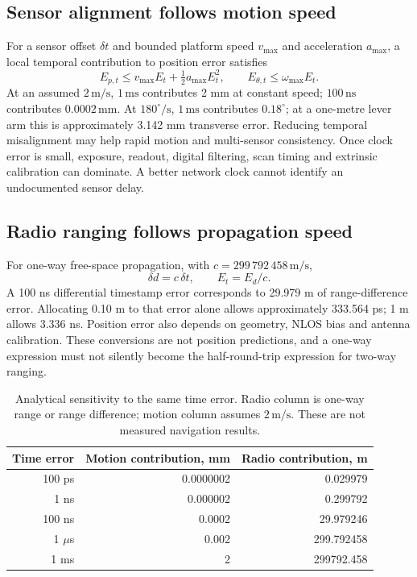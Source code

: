 \documentclass[11pt,letterpaper]{article}
\newcommand{\ns}{\,\mathrm{ns}}\newcommand{\us}{\,\mu\mathrm{s}}\newcommand{\ms}{\,\mathrm{ms}}
\begin{document}
\subsection{Sensor alignment follows motion speed}
For a sensor offset $\delta t$ and bounded platform speed $v_{\max}$ and acceleration $a_{\max}$, a local temporal contribution to position error satisfies
\begin{equation}
 E_{p,t}\leq v_{\max}E_t+\tfrac12 a_{\max}E_t^2,
 \qquad E_{\theta,t}\leq\omega_{\max}E_t.\label{eq:motion}
\end{equation}
At an assumed $2\,\mathrm{m/s}$, $1\ms$ contributes 2 mm at constant speed; $100\ns$ contributes $0.0002\,\mathrm{mm}$. At $180^\circ/\mathrm{s}$, $1\ms$ contributes $0.18^\circ$; at a one-metre lever arm this is approximately 3.142 mm transverse error. Reducing temporal misalignment may help rapid motion and multi-sensor consistency. Once clock error is small, exposure, readout, digital filtering, scan timing and extrinsic calibration can dominate. A better network clock cannot identify an undocumented sensor delay.

\subsection{Radio ranging follows propagation speed}
For one-way free-space propagation, with $c=299\,792\,458\,\mathrm{m/s}$,
\begin{equation}
 \delta d=c\,\delta t,\qquad E_t=E_d/c.\label{eq:light}
\end{equation}
A 100 ns differential timestamp error corresponds to 29.979 m of range-difference error. Allocating 0.10 m to that error alone allows approximately 333.564 ps; 1 m allows 3.336 ns. Position error also depends on geometry, NLOS bias and antenna calibration. These conversions are not position predictions, and a one-way expression must not silently become the half-round-trip expression for two-way ranging.

\begin{table}[ht]\centering\small
\caption{Analytical sensitivity to the same time error. Radio column is one-way range or range difference; motion column assumes $2\,\mathrm{m/s}$. These are not measured navigation results.}
\begin{tabular}{@{}rrr@{}}\toprule
Time error & Motion contribution, mm & Radio contribution, m\\\midrule
100 ps &0.0000002&0.029979\\
1 ns &0.000002&0.299792\\
100 ns &0.0002&29.979246\\
1 $\mu$s &0.002&299.792458\\
1 ms &2&299792.458\\\bottomrule\end{tabular}
\end{table}
\end{document}
